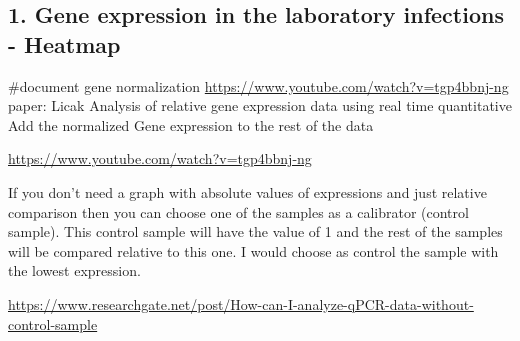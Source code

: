 \documentclass[
]{article}
\begin{document}
\hypertarget{gene-expression-in-the-laboratory-infections---heatmap}{%
\subsection{1. Gene expression in the laboratory infections -
Heatmap}\label{gene-expression-in-the-laboratory-infections---heatmap}}

\#document gene normalization
\url{https://www.youtube.com/watch?v=tgp4bbnj-ng} paper: Licak Analysis
of relative gene expression data using real time quantitative Add the
normalized Gene expression to the rest of the data

\url{https://www.youtube.com/watch?v=tgp4bbnj-ng}

If you don't need a graph with absolute values of expressions and just
relative comparison then you can choose one of the samples as a
calibrator (control sample). This control sample will have the value of
1 and the rest of the samples will be compared relative to this one. I
would choose as control the sample with the lowest expression.

\url{https://www.researchgate.net/post/How-can-I-analyze-qPCR-data-without-control-sample}
\end{document}
